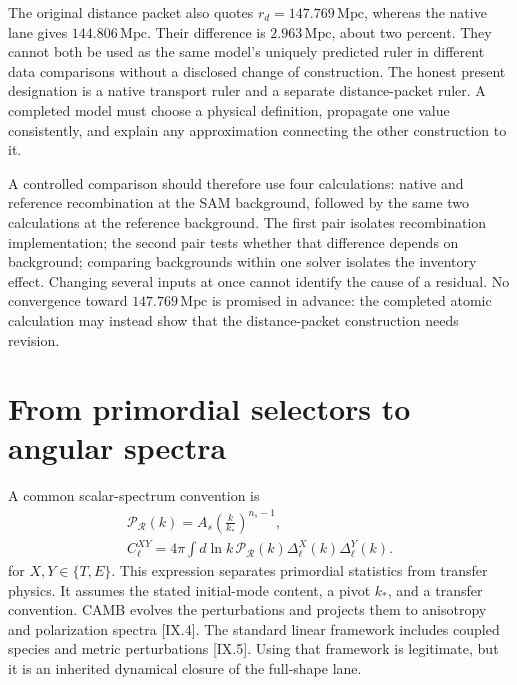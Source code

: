The original distance packet also quotes $r_d=147.769\,\mathrm{Mpc}$, whereas the native lane gives $144.806\,\mathrm{Mpc}$. Their difference is $2.963\,\mathrm{Mpc}$, about two percent. They cannot both be used as the same model's uniquely predicted ruler in different data comparisons without a disclosed change of construction. The honest present designation is a native transport ruler and a separate distance-packet ruler. A completed model must choose a physical definition, propagate one value consistently, and explain any approximation connecting the other construction to it.

A controlled comparison should therefore use four calculations: native and reference recombination at the SAM background, followed by the same two calculations at the reference background. The first pair isolates recombination implementation; the second pair tests whether that difference depends on background; comparing backgrounds within one solver isolates the inventory effect. Changing several inputs at once cannot identify the cause of a residual. No convergence toward $147.769\,\mathrm{Mpc}$ is promised in advance: the completed atomic calculation may instead show that the distance-packet construction needs revision.

\section{From primordial selectors to angular spectra}

A common scalar-spectrum convention is
\begin{equation}
 \begin{gathered}
 \mathcal P_{\mathcal R}(k)=A_s\left(\frac{k}{k_*}\right)^{n_s-1},\\
 C_\ell^{XY}=4\pi\int d\ln k\,
 \mathcal P_{\mathcal R}(k)\Delta_\ell^X(k)\Delta_\ell^Y(k).
 \end{gathered}
 \label{c9:transfer}
\end{equation}
for $X,Y\in\{T,E\}$. This expression separates primordial statistics from transfer physics. It assumes the stated initial-mode content, a pivot $k_*$, and a transfer convention. CAMB evolves the perturbations and projects them to anisotropy and polarization spectra [IX.4]. The standard linear framework includes coupled species and metric perturbations [IX.5]. Using that framework is legitimate, but it is an inherited dynamical closure of the full-shape lane.


